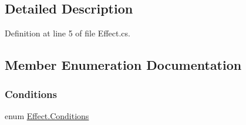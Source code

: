 \subsection{Detailed Description}


Definition at line 5 of file Effect.\+cs.



\subsection{Member Enumeration Documentation}
\mbox{\label{class_effect_ab13a718053e330a11f9f66a9b16f4686}} 
\subsubsection{\texorpdfstring{Conditions}{Conditions}}
{\footnotesize\ttfamily enum \mbox{\hyperlink{class_effect_ab13a718053e330a11f9f66a9b16f4686}{Effect.\+Conditions}}\hspace{0.3cm}{\ttfamily [strong]}}

